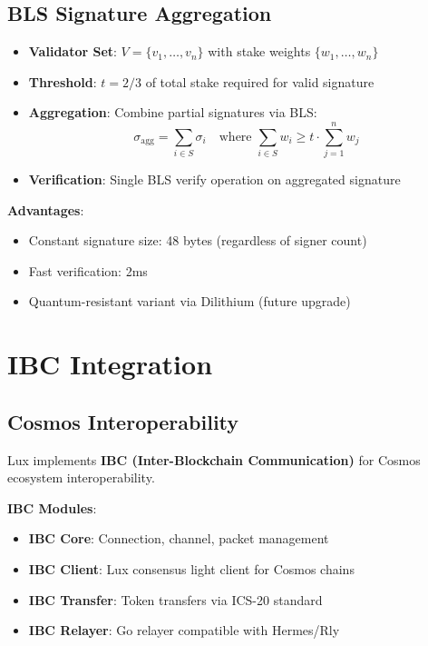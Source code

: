 \documentclass[11pt]{article}
\begin{document}
\subsection{BLS Signature Aggregation}

\begin{itemize}[leftmargin=1.1em]
  \item \textbf{Validator Set}: $V = \{v_1, \ldots, v_n\}$ with stake weights $\{w_1, \ldots, w_n\}$
  \item \textbf{Threshold}: $t = 2/3$ of total stake required for valid signature
  \item \textbf{Aggregation}: Combine partial signatures via BLS:
  \begin{equation}
    \sigma_{\text{agg}} = \sum_{i \in S} \sigma_i \quad \text{where } \sum_{i \in S} w_i \geq t \cdot \sum_{j=1}^n w_j
  \end{equation}
  \item \textbf{Verification}: Single BLS verify operation on aggregated signature
\end{itemize}

\textbf{Advantages}:
\begin{itemize}[leftmargin=1.1em]
  \item Constant signature size: 48 bytes (regardless of signer count)
  \item Fast verification: 2ms
  \item Quantum-resistant variant via Dilithium (future upgrade)
\end{itemize}

\section{IBC Integration}

\subsection{Cosmos Interoperability}

Lux implements \textbf{IBC (Inter-Blockchain Communication)} for Cosmos ecosystem interoperability.

\textbf{IBC Modules}:
\begin{itemize}[leftmargin=1.1em]
  \item \textbf{IBC Core}: Connection, channel, packet management
  \item \textbf{IBC Client}: Lux consensus light client for Cosmos chains
  \item \textbf{IBC Transfer}: Token transfers via ICS-20 standard
  \item \textbf{IBC Relayer}: Go relayer compatible with Hermes/Rly
\end{itemize}
\end{document}
